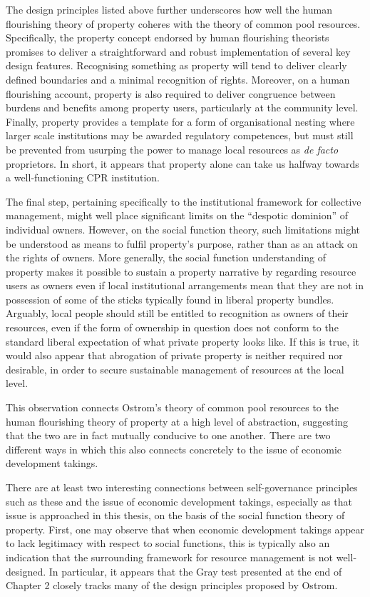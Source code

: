 {The design principles listed above further underscores how well the human flourishing theory of property coheres with the theory of common pool resources. Specifically, the property concept endorsed by human flourishing theorists promises to deliver a straightforward and robust implementation of several key design features. Recognising something as property will tend to deliver clearly defined boundaries and a minimal recognition of rights. Moreover, on a human flourishing account, property is also required to deliver congruence between burdens and benefits among property users, particularly at the community level. Finally, property provides a template for a form of organisational nesting where larger scale institutions may be awarded regulatory competences, but must still be prevented from usurping the power to manage local resources as {\it de facto} proprietors. In short, it appears that property alone can take us halfway towards a well-functioning CPR institution.

The final step, pertaining specifically to the institutional framework for collective management, might well place significant limits on the ``despotic dominion'' of individual owners. However, on the social function theory, such limitations might be understood as means to fulfil property's purpose, rather than as an attack on the rights of owners. More generally, the social function understanding of property makes it possible to sustain a property narrative by regarding resource users as owners even if local institutional arrangements mean that they are not in possession of some of the sticks typically found in liberal property bundles. Arguably, local people should still be entitled to recognition as owners of their resources, even if the form of ownership in question does not conform to the standard liberal expectation of what private property looks like. If this is true, it would also appear that abrogation of private property is neither required nor desirable, in order to secure sustainable management of resources at the local level.


This observation connects Ostrom's theory of common pool resources to the human flourishing theory of property at a high level of abstraction, suggesting that the two are in fact mutually conducive to one another. There are two different ways in which this also connects concretely to the issue of economic development takings.} 
There are at least two interesting connections between self-governance principles such as these and the issue of economic development takings, especially as that issue is approached in this thesis, on the basis of the social function theory of property. First, one may observe that when economic development takings appear to lack legitimacy with respect to social functions, this is typically also an indication that the surrounding framework for resource management is not well-designed. In particular, it appears that the Gray test presented at the end of Chapter 2 closely tracks many of the design principles proposed by Ostrom.

